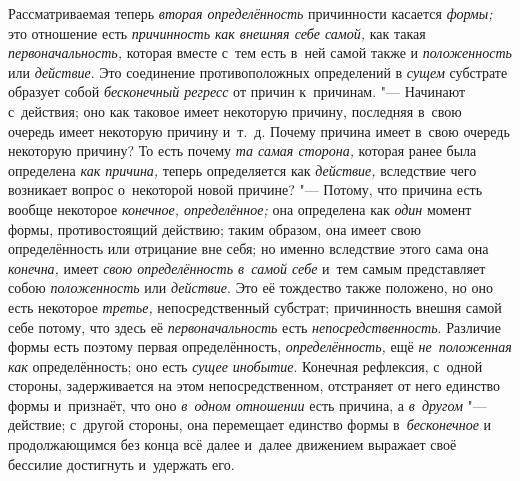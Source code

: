 Рассматриваемая теперь {\em вторая определённость} причинности касается
{\em формы;} это отношение есть {\em причинность как внешняя себе самой,} как
такая {\em первоначальность,} которая вместе с~тем есть в~ней самой также и
{\em положенность} или {\em действие}. Это соединение противоположных
определений в {\em сущем} субстрате образует собой {\em бесконечный регресс} от
причин к~причинам. "--- Начинают с~действия; оно как таковое имеет некоторую
причину, последняя в~свою очередь имеет некоторую причину и~т.~д. Почему
причина имеет в~свою очередь некоторую причину? То есть почему
{\em та самая сторона,} которая ранее была определена {\em как причина,} теперь
определяется как {\em действие,} вследствие чего возникает вопрос о~некоторой
новой причине? "--- Потому, что причина есть вообще некоторое
{\em конечное, определённое;} она определена как {\em один} момент формы,
противостоящий действию; таким образом, она имеет свою определённость или
отрицание вне себя; но именно вследствие этого сама она {\em конечна,} имеет
{\em свою определённость в~самой себе} и~тем самым представляет собою
{\em положенность} или {\em действие}. Это её тождество также положено, но оно
есть некоторое {\em третье,} непосредственный субстрат; причинность внешня
самой себе потому, что здесь её {\em первоначальность} есть
{\em непосредственность}. Различие формы есть поэтому первая определённость,
{\em определённость,} ещё {\em не~положенная как} определённость; оно есть
{\em сущее инобытие}. Конечная рефлексия, с~одной стороны, задерживается на
этом непосредственном, отстраняет от него единство формы и~признаёт, что оно
{\em в~одном отношении} есть причина, а {\em в~другом} "--- действие;
с~другой стороны, она перемещает единство формы в~{\em бесконечное}
и продолжающимся без конца всё далее и~далее движением
выражает своё бессилие достигнуть и~удержать его.

